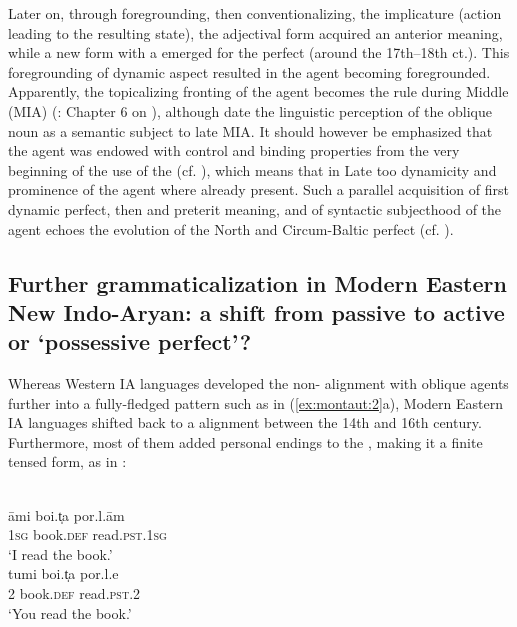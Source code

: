 \documentclass[output=paper]{langsci/langscibook}
\begin{document}
Later on, through foregrounding, then conventionalizing, the implicature (action leading to the resulting state), the adjectival form acquired an anterior meaning, while a new  form with a  emerged for the perfect (around the 17th--18th ct.). This foregrounding of dynamic aspect resulted in the agent becoming foregrounded. Apparently, the topicalizing fronting of the agent becomes the rule during Middle  (MIA) (\citealt{Breunis1990}: Chapter 6 on ), although \citet[116--117]{Bubenik1996} date the linguistic perception of the oblique noun as a semantic subject to late MIA. It should however be emphasized that the agent was endowed with control and binding properties from the very beginning of the use of the   (cf. \citealt{Hock1992}), which means that in Late  too dynamicity and prominence of the agent where already present. Such a parallel acquisition of first dynamic perfect, then  and preterit meaning, and of syntactic subjecthood of the agent echoes the evolution of the North  and Circum-Baltic perfect (cf. \citealt{Seržant2012}).

\subsection{Further grammaticalization in Modern Eastern New Indo-Aryan: a shift from passive to active or ‘possessive perfect’?}\label{sec:montaut:2.2}

Whereas Western IA languages developed the non- alignment with oblique agents further into a fully-fledged  pattern such as in (\ref{ex:montaut:2}a), Modern Eastern IA languages shifted back to a  alignment between the 14th and 16th century. Furthermore, most of them added personal endings to the , making it a finite tensed form, as in :


\ea
\label{ex:montaut:7}
\ea 
{}\\   
\gll āmi     boi.t̩a       por.l.ām\\
\textsc{1sg}     book.\textsc{def}   read.\textsc{pst.1sg} \\ 
\glt ‘I read the book.’
\ex 
{}\\
\gll tumi   boi.t̩a  por.l.e\\
\textsc{2}  book.\textsc{def}    read.\textsc{pst.2} \\
\glt ‘You read the book.’
\z 
\z 
\end{document}
